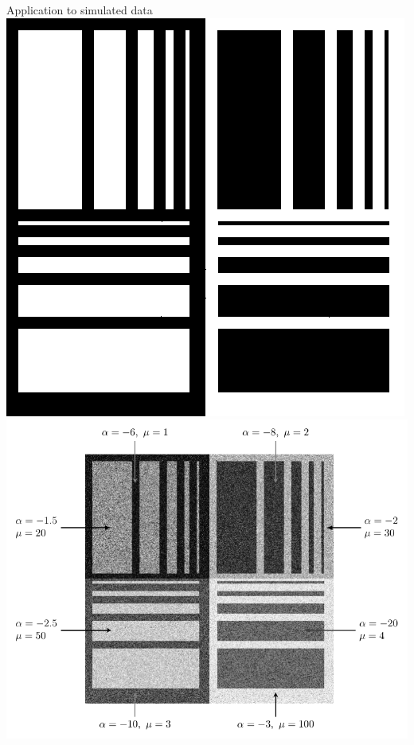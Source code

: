 \documentclass[table,aspectratio=169]{beamer}
\begin{document}
{
\begin{frame}{Application to simulated data}
\centering
\includegraphics[width=.42\linewidth]{../Figures/PNG/Phantom1}
\includegraphics[width=.57\linewidth]{../Figures/PNG/Phantom_label/Phantom_labels}
\end{frame}
}
\end{document}
